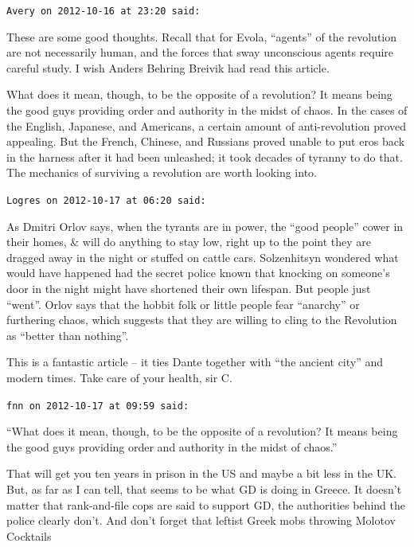 \begin{footnotesize}
\begin{sffamily}
\texttt{Avery on 2012-10-16 at 23:20 said:}

These are some good thoughts. Recall that for Evola, ``agents'' of the revolution are not necessarily human, and the forces that sway unconscious agents require careful study. I wish Anders Behring Breivik had read this article.

What does it mean, though, to be the opposite of a revolution? It means being the good guys providing order and authority in the midst of chaos. In the cases of the English, Japanese, and Americans, a certain amount of anti-revolution proved appealing. But the French, Chinese, and Russians proved unable to put eros back in the harness after it had been unleashed; it took decades of tyranny to do that. The mechanics of surviving a revolution are worth looking into.

\hfill

\texttt{Logres on 2012-10-17 at 06:20 said:}

As Dmitri Orlov says, when the tyrants are in power, the ``good people'' cower in their homes, \& will do anything to stay low, right up to the point they are dragged away in the night or stuffed on cattle cars. Solzenhitsyn wondered what would have happened had the secret police known that knocking on someone's door in the night might have shortened their own lifespan. But people just ``went''. Orlov says that the hobbit folk or little people fear ``anarchy'' or furthering chaos, which suggests that they are willing to cling to the Revolution as ``better than nothing''.

This is a fantastic article -- it ties Dante together with ``the ancient city'' and modern times. Take care of your health, sir C.

\hfill

\texttt{fnn on 2012-10-17 at 09:59 said:}

``What does it mean, though, to be the opposite of a revolution? It means being the good guys providing order and authority in the midst of chaos.''

That will get you ten years in prison in the US and maybe a bit less in the UK. But, as far as I can tell, that seems to be what GD is doing in Greece. It doesn't matter that rank-and-file cops are said to support GD, the authorities behind the police clearly don't. And don't forget that leftist Greek mobs throwing Molotov Cocktails


\end{sffamily}
\end{footnotesize}
